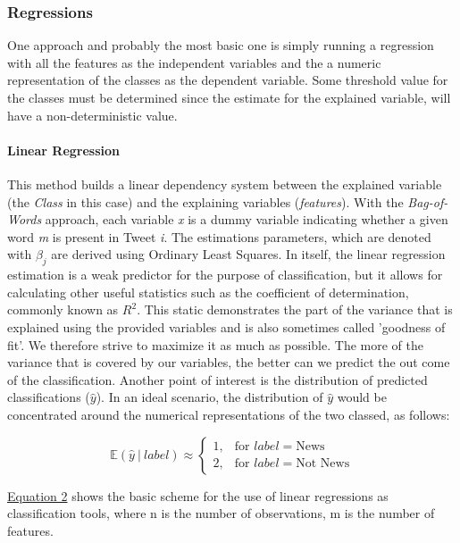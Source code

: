 		\subsubsection*{Regressions}
		One approach and probably the most basic one is simply running a regression with all the features as the independent variables and the a numeric representation of the classes as the dependent variable. Some threshold value for the classes must be determined since the estimate for the explained variable, will have a non-deterministic value.
		\par
			\paragraph{Linear Regression} 
			This method builds a linear dependency system between the explained variable (the \textit{Class} in this case) and the explaining variables (\textit{features}). With the \textit{Bag-of-Words} approach, each variable \textit{x} is a dummy variable indicating whether a given word \textit{m} is present in Tweet \textit{i}. The estimations parameters, which are denoted with $\beta_j$ are derived using Ordinary Least Squares. In itself, the linear regression estimation is a weak predictor for the purpose of classification, but it allows for calculating other useful statistics such as the coefficient of determination, commonly known as $R^2$. This static demonstrates the part of the variance that is explained using the provided variables and is also sometimes called 'goodness of fit'. We therefore strive to maximize it as much as possible. The more of the variance that is covered by our variables, the better can we predict the out come of the classification. Another point of interest is the distribution of predicted classifications ($\hat{y}$). In an ideal scenario, the distribution of $\hat{y}$ would be concentrated around the numerical representations of the two classed, as follows:
			
			\begin{equation}
				\mathbb{E}(\hat{y} \ \vert \ label) \approx \begin{cases}
				1,   & \text{for } label = \text{News}\\
				2, & \text{for } label = \text{Not News}
				\end{cases}
			\end{equation}
			
			\newpage
			
			\hyperref[Linear_Regression]{Equation 2} shows the basic scheme for the use of linear regressions as classification tools, where n is the number of observations, m is the number of features.
			

